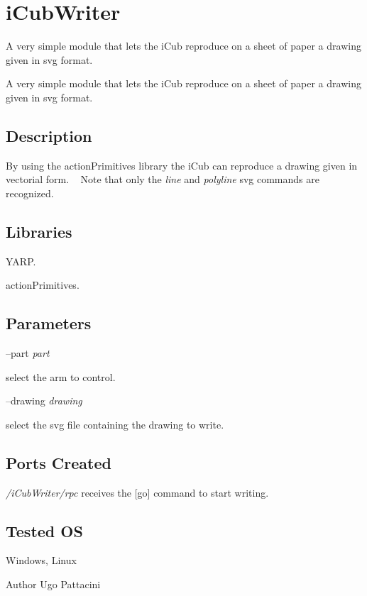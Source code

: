 \section{i\+Cub\+Writer}
\label{group__icub__iCubWriter}


A very simple module that lets the i\+Cub reproduce on a sheet of paper a drawing given in svg format.  


A very simple module that lets the i\+Cub reproduce on a sheet of paper a drawing given in svg format. 

\hypertarget{group__icub__iCubWriter_intro_sec}{}\subsection{Description}\label{group__icub__iCubWriter_intro_sec}
By using the action\+Primitives library the i\+Cub can reproduce a drawing given in vectorial form. ~\newline
 Note that only the {\itshape line} and {\itshape polyline} svg commands are recognized. ~\newline
\hypertarget{group__icub__iCubWriter_lib_sec}{}\subsection{Libraries}\label{group__icub__iCubWriter_lib_sec}

\begin{DoxyItemize}
\item Y\+A\+RP.
\item action\+Primitives.
\end{DoxyItemize}\hypertarget{group__icub__iCubWriter_parameters_sec}{}\subsection{Parameters}\label{group__icub__iCubWriter_parameters_sec}
--part {\itshape part} 
\begin{DoxyItemize}
\item select the arm to control.
\end{DoxyItemize}

--drawing {\itshape drawing} 
\begin{DoxyItemize}
\item select the svg file containing the drawing to write.
\end{DoxyItemize}\hypertarget{group__icub__iCubWriter_portsc_sec}{}\subsection{Ports Created}\label{group__icub__iCubWriter_portsc_sec}
{\itshape /i\+Cub\+Writer/rpc} receives the \mbox{[}go\mbox{]} command to start writing.\hypertarget{group__icub__iCubWriter_tested_os_sec}{}\subsection{Tested OS}\label{group__icub__iCubWriter_tested_os_sec}
Windows, Linux

\begin{DoxyAuthor}{Author}
Ugo Pattacini 
\end{DoxyAuthor}
